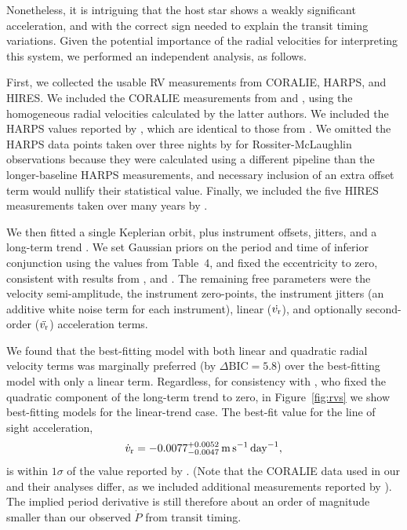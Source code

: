 \documentclass[12pt,twocolumn,tighten]{aastex62}
\begin{document}
{Nonetheless, it is intriguing that the host star shows a weakly
significant acceleration, and with the correct sign needed to explain
the transit timing variations.  Given the potential importance of the radial velocities for
interpreting this system, we performed an independent analysis,
as follows.  

First, we collected the usable RV measurements from CORALIE, HARPS,
and HIRES.  We included the CORALIE measurements from
\citet{wilson_wasp-4b_2008} and \citet{triaud_spin-orbit_2010}, using
the homogeneous radial velocities calculated by the latter authors. We
included the HARPS values reported by \citet{pont_determining_2011},
which are identical to those from \citet{husnoo_observational_2012}.
We omitted the HARPS data points taken over three nights by
\citet{triaud_spin-orbit_2010} for Rossiter-McLaughlin observations
because they were calculated using a different pipeline than the
longer-baseline \citealt{pont_determining_2011} HARPS measurements,
and necessary inclusion of an extra offset term would nullify their
statistical value.  Finally, we included the five HIRES measurements
taken over many years by \citet{knutson_friends_2014}.  

We then fitted a single Keplerian orbit, plus instrument offsets,
jitters, and a long-term trend
\citep[][\texttt{radvel}]{fulton_radvel_2018}.  We set Gaussian priors
on the period and time of inferior conjunction using the values from
Table~4, and fixed the eccentricity to zero, consistent with results
from \citet{beerer_secondary_2011}, \citet{knutson_friends_2014} and
\citet{bonomo_gaps_2017}.  The remaining free parameters were the
velocity semi-amplitude, the instrument zero-points, the instrument
jitters (an additive white noise term for each instrument), linear
($\dot{v_{\rm r}}$), and optionally second-order ($\ddot{v_{\rm r}}$)
acceleration terms.

We found that the best-fitting model with both linear and quadratic
radial velocity terms was marginally preferred (by $\Delta
\mathrm{BIC} = 5.8$) over the best-fitting model with only a linear
term.  Regardless, for consistency with \citet{knutson_friends_2014},
who fixed the quadratic component of the long-term trend to zero, in
Figure~\ref{fig:rvs} we show best-fitting models for the linear-trend
case.  The best-fit value for the line of sight acceleration,
\begin{equation}
  \dot{v}_{\rm r} =
     -0.0077^{+0.0052}_{-0.0047}
     \,{\rm m}\,{\rm s}^{-1}\,{\rm day}^{-1},
\end{equation}
is within $1\sigma$ of the value reported by
\citet{knutson_friends_2014}. (Note that the CORALIE data used in our
and their analyses differ, as we included additional measurements
reported by \citealt{triaud_spin-orbit_2010}).  The implied period
derivative is still therefore about an order of magnitude smaller than
our observed $\dot{P}$ from transit timing.

}
\end{document}
